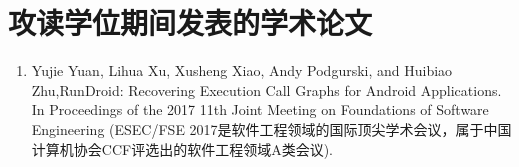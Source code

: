 \chapter*{攻读学位期间发表的学术论文}



\begin{enumerate}
	
	\item Yujie Yuan, Lihua Xu, Xusheng Xiao, Andy Podgurski, and Huibiao Zhu,RunDroid: Recovering Execution Call Graphs for Android Applications. In Proceedings of the 2017 11th Joint Meeting on Foundations of Software Engineering 
	(ESEC/FSE 2017是软件工程领域的国际顶尖学术会议，属于中国计算机协会CCF评选出的软件工程领域A类会议).
	
\end{enumerate}


